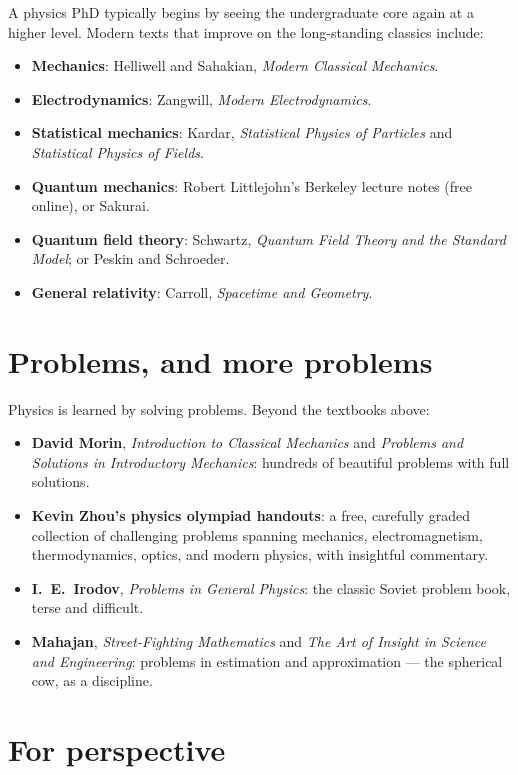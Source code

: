 A physics PhD typically begins by seeing the undergraduate core again at a higher level. Modern texts that improve on the long-standing classics include:
\begin{itemize}[itemsep=3pt]
  \item \textbf{Mechanics}: Helliwell and Sahakian, \emph{Modern Classical Mechanics}.
  \item \textbf{Electrodynamics}: Zangwill, \emph{Modern Electrodynamics}.
  \item \textbf{Statistical mechanics}: Kardar, \emph{Statistical Physics of Particles} and \emph{Statistical Physics of Fields}.
  \item \textbf{Quantum mechanics}: Robert Littlejohn's Berkeley lecture notes (free online), or Sakurai.
  \item \textbf{Quantum field theory}: Schwartz, \emph{Quantum Field Theory and the Standard Model}; or Peskin and Schroeder.
  \item \textbf{General relativity}: Carroll, \emph{Spacetime and Geometry}.
\end{itemize}

\section*{Problems, and more problems}

Physics is learned by solving problems. Beyond the textbooks above:
\begin{itemize}[itemsep=3pt]
  \item \textbf{David Morin}, \emph{Introduction to Classical Mechanics} and \emph{Problems and Solutions in Introductory Mechanics}: hundreds of beautiful problems with full solutions.
  \item \textbf{Kevin Zhou's physics olympiad handouts}: a free, carefully graded collection of challenging problems spanning mechanics, electromagnetism, thermodynamics, optics, and modern physics, with insightful commentary.
  \item \textbf{I.\ E.\ Irodov}, \emph{Problems in General Physics}: the classic Soviet problem book, terse and difficult.
  \item \textbf{Mahajan}, \emph{Street-Fighting Mathematics} and \emph{The Art of Insight in Science and Engineering}: problems in estimation and approximation --- the spherical cow, as a discipline.
\end{itemize}

\section*{For perspective}

